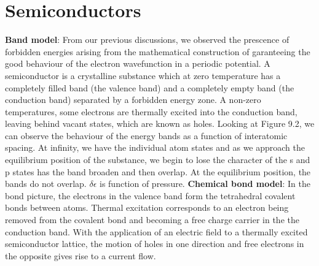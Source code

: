 \documentclass{article}
\numberwithin{equation}{section}
\begin{document}
\section*{Semiconductors}
\textbf{Band model}: From our previous discussions, we observed the prescence of forbidden energies arising from the mathematical construction of garanteeing the good behaviour of the electron wavefunction in a periodic potential. A semiconductor is a crystalline substance which at zero temperature has a completely filled band (the valence band) and a completely empty band (the conduction band) separated by a forbidden energy zone. A non-zero temperatures, some electrons are thermally excited into the conduction band, leaving behind vacant states, which are known as holes. Looking at Figure 9.2, we can observe the behaviour of the energy bands as a function of interatomic spacing. At infinity, we have the individual atom states and as we approach the equilibrium position of the substance, we begin to lose the character of the s and p states has the band broaden and then overlap. At the equilibrium position, the bands do not overlap. $\delta \epsilon $ is function of pressure.
\newline
\textbf{Chemical bond model}: In the bond picture, the electrons in the valence band form the tetrahedral covalent bonds between atoms. Thermal excitation corresponds to an electron being removed from the covalent bond and becoming a free charge carrier in the the conduction band. With the application of an electric field to a thermally excited semiconductor lattice, the motion of holes in one direction and free electrons in the opposite gives rise to a current flow.
\newline
\end{document}
